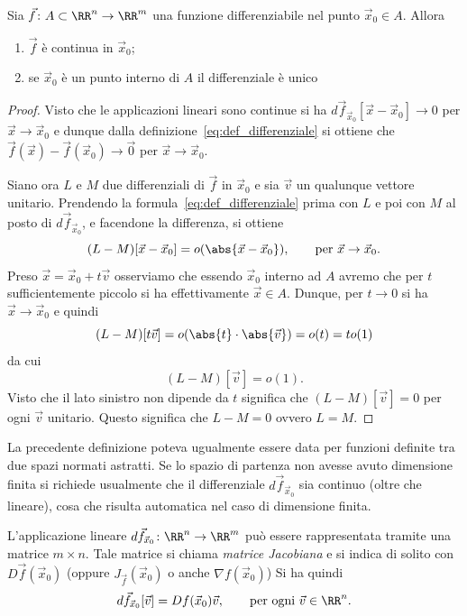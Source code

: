 \begin{theorem}
Sia $\vec f\colon A\subset \RR^n \to \RR^m$ una funzione 
differenziabile nel punto $\vec x_0\in A$. Allora
\begin{enumerate}
  \item $\vec f$ è continua in $\vec x_0$;
  \item se $\vec x_0$ è un punto interno di $A$
  il differenziale è unico
\end{enumerate}
\end{theorem}
\begin{proof}
Visto che le applicazioni lineari sono continue
si ha $d\vec f_{\vec x_0}[\vec x - \vec x_0]\to 0$ per $\vec x \to \vec x_0$
e dunque dalla definizione~\eqref{eq:def_differenziale} 
si ottiene che $\vec f(\vec x) - \vec f(\vec x_0)\to \vec 0$
per $\vec x \to \vec x_0$. 

Siano ora $L$ e $M$ due differenziali di $\vec f$ in $\vec x_0$
e sia $\vec v$ un qualunque vettore unitario.
Prendendo la formula~\eqref{eq:def_differenziale}
prima con $L$ e poi con $M$ al posto di $d \vec f_{\vec x_0}$,
e facendone la differenza, si ottiene
\[
  (L-M)[\vec x - \vec x_0] = o(\abs{\vec x-\vec x_0}), 
  \qquad \text{per } \vec x \to \vec x_0.
\]
Preso $\vec x = \vec x_0 + t\vec v$ osserviamo che essendo $\vec x_0$ interno 
ad $A$ avremo che per $t$ sufficientemente piccolo si ha effettivamente 
$\vec x \in A$. 
Dunque, per $t\to 0$ si ha $\vec x \to \vec x_0$ e quindi
\[
  (L-M)[t \vec v] = o(\abs{t}\cdot \abs{\vec v}) = o(t) = t o(1)
\] 
da cui 
\[
  (L-M)[\vec v] = o(1).
\]
Visto che il lato sinistro non dipende da $t$ 
significa che $(L-M)[\vec v]=0$ per ogni $\vec v$ unitario.
Questo significa che $L-M = 0$ ovvero $L=M$.
\end{proof}

La precedente definizione poteva ugualmente essere data 
per funzioni definite tra due spazi normati astratti.
Se lo spazio di partenza non avesse avuto dimensione finita 
si richiede usualmente che il differenziale $d\vec f_{\vec x_0}$ 
sia continuo (oltre che lineare), cosa che risulta automatica
nel caso di dimensione finita.

L'applicazione lineare $d\vec f_{\vec x_0}\colon \RR^n\to\RR^m$ 
può essere rappresentata tramite una matrice $m\times n$. 
Tale matrice si chiama \emph{matrice Jacobiana} e si indica 
di solito con $D\vec f(\vec x_0)$ (oppure $J_{\vec f}(\vec x_0)$ o anche 
$\nabla f(\vec x_0)$)
Si ha quindi
\[
  d \vec f_{\vec x_0} [\vec v] = Df(\vec x_0) \vec v,
  \qquad \text{per ogni } \vec v\in \RR^n.
\]


